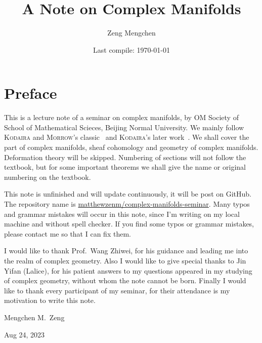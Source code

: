 \documentclass[a4paper]{book}
\title{A Note on Complex Manifolds}
\author{Zeng Mengchen}
\date{Last compile: \today}
\theoremstyle{definition}
\theoremstyle{plain}
\theoremstyle{remark}
\numberwithin{equation}{section}
\begin{document}
\maketitle
\thispagestyle{empty}

\frontmatter

\tableofcontents
\newpage
\thispagestyle{empty}

\chapter{Preface}

This is a lecture note of a seminar on complex manifolds, by OM Society of School of Mathematical Scieces, Beijing Normal University.
We mainly follow \textsc{Kodaira} and \textsc{Morrow}'s classic~\cite{Kodaira06} and \textsc{Kodaira}'s later work~\cite{Kodaira05}.
We shall cover the part of complex manifolds, sheaf cohomology and geometry of complex manifolds.
Deformation theory will be skipped.
Numbering of sections will not follow the textbook, but for some important theorems we shall give the name or original numbering on the textbook.

This note is unfinished and will update continuously, it will be post on GitHub.
The repository name is \href{https://github.com/matthewzenm/complex-manifolds-seminar}{matthewzenm/complex-manifolds-seminar}.
Many typos and grammar mistakes will occur in this note, since I'm writing on my local machine and without spell checker.
If you find some typos or grammar mistakes, please contact me so that I can fix them.

I would like to thank Prof.\ Wang Zhiwei, for his guidance and leading me into the realm of complex geometry.
Also I would like to give special thanks to Jin Yifan (Lalice), for his patient answers to my questions appeared in my studying of complex geometry, without whom the note cannot be born.
Finally I would like to thank every participant of my seminar, for their attendance is my motivation to write this note.


\begin{flushright}
    Mengchen M.\ Zeng

    Aug 24, 2023
\end{flushright}

\newpage
\thispagestyle{empty}

\mainmatter




\backmatter


\end{document}
